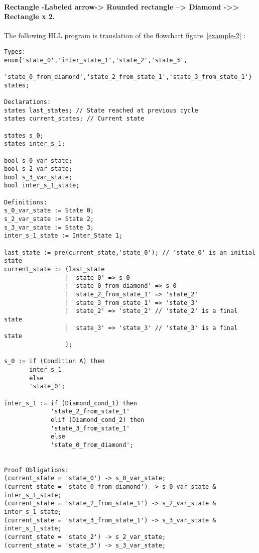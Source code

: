 \paragraph{Rectangle -Labeled arrow-> Rounded rectangle --> Diamond ->> Rectangle x 2.}
The following HLL program is translation of the flowchart
figure~\ref{example-2} : 
{\footnotesize
\begin{verbatim}
Types:
enum{'state_0','inter_state_1','state_2','state_3',
     'state_0_from_diamond','state_2_from_state_1','state_3_from_state_1'} states;

Declarations:
states last_states; // State reached at previous cycle
states current_states; // Current state

states s_0;
states inter_s_1;

bool s_0_var_state;
bool s_2_var_state;
bool s_3_var_state;
bool inter_s_1_state;

Definitions:
s_0_var_state := State 0;
s_2_var_state := State 2;
s_3_var_state := State 3;
inter_s_1_state := Inter_State 1;

last_state := pre(current_state,'state_0'); // 'state_0' is an initial state
current_state := (last_state
                 | 'state_0' => s_0
                 | 'state_0_from_diamond' => s_0
                 | 'state_2_from_state_1' => 'state_2'
                 | 'state_3_from_state_1' => 'state_3'
                 | 'state_2' => 'state_2' // 'state_2' is a final state
                 | 'state_3' => 'state_3' // 'state_3' is a final state
                 );

s_0 := if (Condition A) then
       inter_s_1
       else
       'state_0';

inter_s_1 := if (Diamond_cond_1) then
             'state_2_from_state_1'
             elif (Diamond_cond_2) then
             'state_3_from_state_1'
             else
             'state_0_from_diamond';


Proof Obligations:
(current_state = 'state_0') -> s_0_var_state;
(current_state = 'state_0_from_diamond') -> s_0_var_state & inter_s_1_state;
(current_state = 'state_2_from_state_1') -> s_2_var_state & inter_s_1_state;
(current_state = 'state_3_from_state_1') -> s_3_var_state & inter_s_1_state;
(current_state = 'state_2') -> s_2_var_state;
(current_state = 'state_3') -> s_3_var_state;
\end{verbatim}
}







